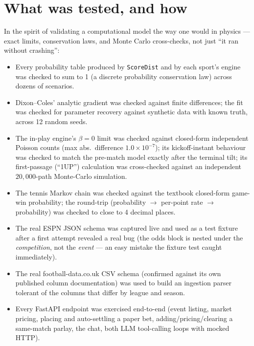 \documentclass[11pt]{article}
\begin{document}
\section{What was tested, and how}
In the spirit of validating a computational model the way one would in physics --- exact limits,
conservation laws, and Monte Carlo cross-checks, not just ``it ran without crashing'':
\begin{itemize}
\item Every probability table produced by \texttt{ScoreDist} and by each sport's engine was
checked to sum to 1 (a discrete probability conservation law) across dozens of scenarios.
\item Dixon--Coles' analytic gradient was checked against finite differences; the fit was checked
for parameter recovery against synthetic data with known truth, across 12 random seeds.
\item The in-play engine's $\beta=0$ limit was checked against closed-form independent Poisson
counts (max abs.\ difference $1.0\times10^{-7}$); its kickoff-instant behaviour was checked to
match the pre-match model exactly after the terminal tilt; its first-passage (``1UP'') calculation
was cross-checked against an independent $20{,}000$-path Monte-Carlo simulation.
\item The tennis Markov chain was checked against the textbook closed-form game-win probability;
the round-trip (probability $\to$ per-point rate $\to$ probability) was checked to close to 4
decimal places.
\item The real ESPN JSON schema was captured live and used as a test fixture after a first attempt
revealed a real bug (the odds block is nested under the \emph{competition}, not the \emph{event}
--- an easy mistake the fixture test caught immediately).
\item The real football-data.co.uk CSV schema (confirmed against its own published column
documentation) was used to build an ingestion parser tolerant of the columns that differ by
league and season.
\item Every FastAPI endpoint was exercised end-to-end (event listing, market pricing, placing and
auto-settling a paper bet, adding/pricing/clearing a same-match parlay, the chat, both LLM
tool-calling loops with mocked HTTP).
\end{itemize}
\end{document}
